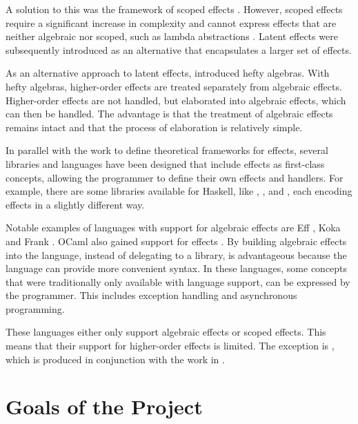 \documentclass{article}
\begin{document}
A solution to this was the framework of scoped effects \cite{wu_effect_2014}. However, scoped effects require a significant increase in complexity and cannot express effects that are neither algebraic nor scoped, such as lambda abstractions \cite{oh_latent_2021}. Latent effects \cite{oh_latent_2021} were subsequently introduced as an alternative that encapsulates a larger set of effects.

As an alternative approach to latent effects, \textcite{bach_poulsen_hefty_2023} introduced hefty algebras. With hefty algebras, higher-order effects are treated separately from algebraic effects. Higher-order effects are not handled, but elaborated into algebraic effects, which can then be handled. The advantage is that the treatment of algebraic effects remains intact and that the process of elaboration is relatively simple.

In parallel with the work to define theoretical frameworks for effects, several libraries and languages have been designed that include effects as first-class concepts, allowing the programmer to define their own effects and handlers. For example, there are some libraries available for Haskell, like , ,  and , each encoding effects in a slightly different way.

Notable examples of languages with support for algebraic effects are Eff \cite{bauer_programming_2015}, Koka \cite{leijen_koka_2014} and Frank \cite{lindley_be_2017}. OCaml also gained support for effects \cite{sivaramakrishnan_retrofitting_2021}. By building algebraic effects into the language, instead of delegating to a library, is advantageous because the language can provide more convenient syntax. In these languages, some concepts that were traditionally only available with language support, can be expressed by the programmer. This includes exception handling and asynchronous programming.

These languages either only support algebraic effects or scoped effects. This means that their support for higher-order effects is limited. The exception is , which is produced in conjunction with the work in \cite{bach_poulsen_hefty_2023}.

\section{Goals of the Project}
\end{document}
